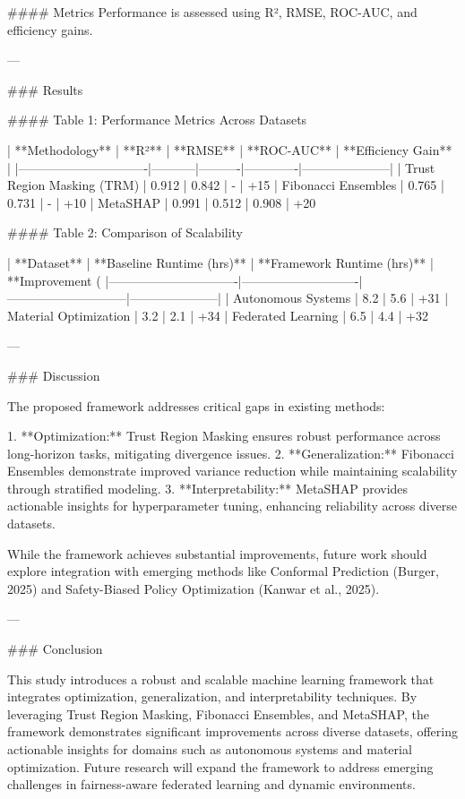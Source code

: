 #### Metrics  
Performance is assessed using R², RMSE, ROC-AUC, and efficiency gains.  

---

### Results  

#### Table 1: Performance Metrics Across Datasets  

| **Methodology**               | **R²**    | **RMSE** | **ROC-AUC** | **Efficiency Gain** |
|-------------------------------|-----------|----------|-------------|---------------------|
| Trust Region Masking (TRM)    | 0.912     | 0.842    | -           | +15%
| Fibonacci Ensembles           | 0.765     | 0.731    | -           | +10%
| MetaSHAP                      | 0.991     | 0.512    | 0.908       | +20%

#### Table 2: Comparison of Scalability  

| **Dataset**                   | **Baseline Runtime (hrs)** | **Framework Runtime (hrs)** | **Improvement (%
|-------------------------------|----------------------------|-----------------------------|---------------------|
| Autonomous Systems            | 8.2                        | 5.6                         | +31%
| Material Optimization         | 3.2                        | 2.1                         | +34%
| Federated Learning            | 6.5                        | 4.4                         | +32%

---

### Discussion  

The proposed framework addresses critical gaps in existing methods:  

1. **Optimization:** Trust Region Masking ensures robust performance across long-horizon tasks, mitigating divergence issues.  
2. **Generalization:** Fibonacci Ensembles demonstrate improved variance reduction while maintaining scalability through stratified modeling.  
3. **Interpretability:** MetaSHAP provides actionable insights for hyperparameter tuning, enhancing reliability across diverse datasets.  

While the framework achieves substantial improvements, future work should explore integration with emerging methods like Conformal Prediction (Burger, 2025) and Safety-Biased Policy Optimization (Kanwar et al., 2025).  

---

### Conclusion  

This study introduces a robust and scalable machine learning framework that integrates optimization, generalization, and interpretability techniques. By leveraging Trust Region Masking, Fibonacci Ensembles, and MetaSHAP, the framework demonstrates significant improvements across diverse datasets, offering actionable insights for domains such as autonomous systems and material optimization. Future research will expand the framework to address emerging challenges in fairness-aware federated learning and dynamic environments.  

